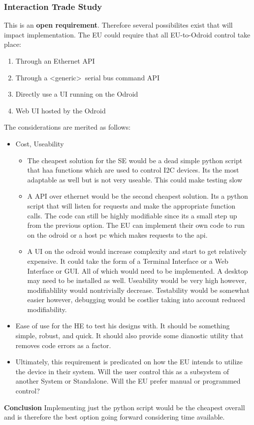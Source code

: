 \documentclass[11pt,letterpaper]{article}
\begin{document}
\subsubsection{Interaction Trade Study}
\label{sec:undefined_ui_req}
This is an {\color{red} \textbf{open requirement}}. Therefore several possibilites exist that will impact implementation.
The EU could require that all EU-to-Odroid control take place:
\begin{enumerate}
    \item Through an Ethernet API
    \item Through a \textless generic\textgreater \ serial bus command API
    \item Directly use a UI running on the Odroid
    \item Web UI hosted by the Odroid 
\end{enumerate}

The considerations are merited as follows:
\begin{itemize}
    \item Cost, Useability
    \begin{itemize}

        \item The cheapest solution for the SE would be a dead simple python script that haa functions which
            are used to control I2C devices. Its the most adaptable as well but is not very useable. This could
            make testing slow
        \item A API over ethernet would be the second cheapest solution. Its a python script that will listen for
            requests and make the appropriate function calls. The code can still be highly modifiable since its a small step
            up from the previous option. The EU can implement their own code to run on the odroid or a host pc which makes requests to the api.
        \item A UI on the odroid would increase complexity and start to get relatively expensive. It could take the form of a 
            Terminal Interface or a Web Interface or GUI. All of which would need to be implemented. 
            A desktop may need to be installed as well. Useability would be very high however, modifiablility would nontrivially decrease. Testability
            would be somewhat easier however, debugging would be costlier taking into account reduced modifiability.

    \end{itemize}
    \item Ease of use for the HE to test his designs with. It should be something simple, robust, and quick. It should also provide some
        dianostic utility that removes code errors as a factor.
 
    \item Ultimately, this requirement is predicated on how the EU intends to utilize the device in their system. Will the user control this as
        a subsystem of another System or Standalone. Will the EU prefer manual or programmed control?
\end{itemize}
\textbf{Conclusion} Implementing just the python script would be the cheapest overall and is therefore the best option going forward considering time available.
\end{document}
